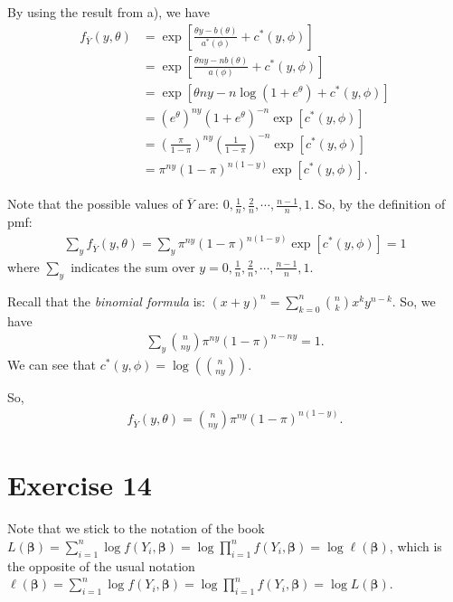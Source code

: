 \documentclass[a4paper]{article}
\begin{document}
 
By using the result from a), we have
\begin{align*}
f_{\overline{Y}}(y,\theta) &= \exp\left[\frac{\theta y - b(\theta)}{a^{*}(\phi)} + c^{*}(y,\phi)\right]\\
&= \exp\left[\frac{\theta ny - n b(\theta)}{a(\phi)} +c^{*}(y,\phi)\right]\\
&= \exp\left[\theta ny -n\log(1+e^{\theta}) +c^{*}(y,\phi)\right]\\
&= \left(e^{\theta}\right)^{ny}\left(1+e^{\theta}\right)^{-n}\exp\left[c^{*}(y,\phi)\right]\\
&= \left(\frac{\pi}{1-\pi}\right)^{ny}\left(\frac{1}{1-\pi}\right)^{-n}\exp\left[c^{*}(y,\phi)\right]\\
&= \pi^{ny}(1-\pi)^{n(1-y)} \exp\left[c^{*}(y,\phi)\right].
\end{align*}

Note that the possible values of $\overline{Y}$ are: $0, \frac{1}{n}, \frac{2}{n}, \cdots ,\frac{n-1}{n}, 1$. So, by the definition of pmf:
\begin{align*}
\sum_{y} f_{\overline{Y}}(y,\theta) = \sum_{y} \pi^{ny}(1-\pi)^{n(1-y)}\exp\left[c^{*}(y,\phi)\right] = 1
\end{align*}
where $\sum_{y}$ indicates the sum over $y = 0, \frac{1}{n}, \frac{2}{n}, \cdots ,\frac{n-1}{n}, 1$.



Recall that the \textit{binomial formula} is: $(x+y)^{n}=\sum_{k=0}^{n}\binom{n}{k}x^{k}y^{n-k}$.
So, we have
\begin{align*}
\sum_{y} \binom{n}{ny}\pi^{ny}(1-\pi)^{n-ny} = 1.
\end{align*}
We can see that $c^{*}(y,\phi) = \log\left(\binom{n}{ny}\right)$.

So, 
\begin{align*}
f_{\overline{Y}}(y,\theta) = \binom{n}{ny}\pi^{ny}(1-\pi)^{n(1-y)}.
\end{align*}



\vspace{\baselineskip}
\section{Exercise 14}
Note that we stick to the notation of the book
$L(\bm{\beta}) = \sum_{i=1}^{n} \log f(Y_{i},\bm{\beta}) = \log \prod_{i=1}^{n} f(Y_{i},\bm{\beta}) =  \log \ell(\bm{\beta})$, which is the opposite of the usual notation $\ell(\bm{\beta}) = \sum_{i=1}^{n} \log f(Y_{i},\bm{\beta}) = \log \prod_{i=1}^{n} f(Y_{i},\bm{\beta}) =  \log L(\bm{\beta})$.\\
\end{document}
